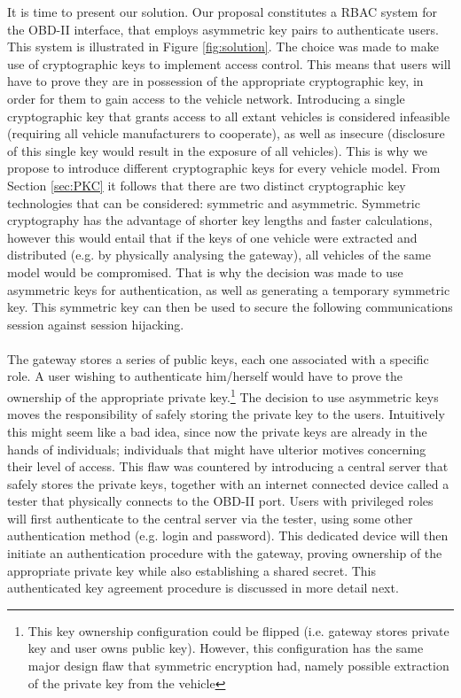 It is time to present our solution. Our proposal constitutes a RBAC system for the OBD-II interface, that employs asymmetric key pairs to authenticate users. This system is illustrated in Figure \ref{fig:solution}. The choice was made to make use of cryptographic keys to implement access control. This means that users will have to prove they are in possession of the appropriate cryptographic key, in order for them to gain access to the vehicle network. Introducing a single cryptographic key that grants access to all extant vehicles is considered infeasible (requiring all vehicle manufacturers to cooperate), as well as insecure (disclosure of this single key would result in the exposure of all vehicles). This is why we propose to introduce different cryptographic keys for every vehicle model. From Section \ref{sec:PKC} it follows that there are two distinct cryptographic key technologies that can be considered: symmetric and asymmetric. Symmetric cryptography has the advantage of shorter key lengths and faster calculations, however this would entail that if the keys of one vehicle were extracted and distributed (e.g. by physically analysing the gateway), all vehicles of the same model would be compromised. That is why the decision was made to use asymmetric keys for authentication, as well as generating a temporary symmetric key. This symmetric key can then be used to secure the following communications session against session hijacking. \\ \\ The gateway stores a series of public keys, each one associated with a specific role. A user wishing to authenticate him/herself would have to prove the ownership of the appropriate private key.\footnote{This key ownership configuration could be flipped (i.e. gateway stores private key and user owns public key). However, this configuration has the same major design flaw that symmetric encryption had, namely possible extraction of the private key from the vehicle} The decision to use asymmetric keys moves the responsibility of safely storing the private key to the users. Intuitively this might seem like a bad idea, since now the private keys are already in the hands of individuals; individuals that might have ulterior motives concerning their level of access. This flaw was countered by introducing a central server that safely stores the private keys, together with an internet connected device called a tester that physically connects to the OBD-II port. Users with privileged roles will first authenticate to the central server via the tester, using some other authentication method (e.g. login and password). This dedicated device will then initiate an authentication procedure with the gateway, proving ownership of the appropriate private key while also establishing a shared secret. This authenticated key agreement procedure is discussed in more detail next.

